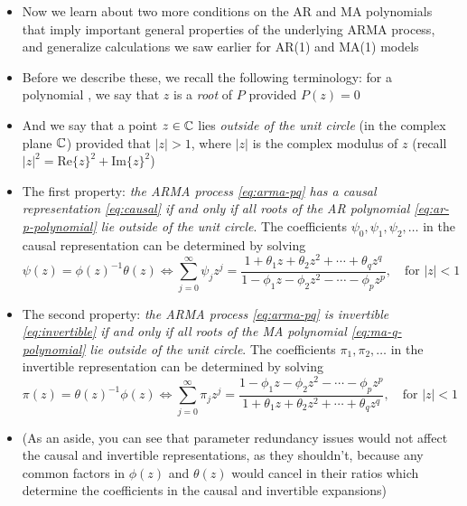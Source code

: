 \documentclass{article}
\begin{document}
\begin{itemize}
\item Now we learn about two more conditions on the AR and MA polynomials that
  imply important general properties of the underlying ARMA process, and
  generalize calculations we saw earlier for AR(1) and MA(1) models

\item Before we describe these, we recall the following terminology: for a
  polynomial , we say that $z$ is a
  \emph{root} of $P$ provided $P(z) = 0$

\item And we say that a point $z \in \mathbb{C}$ lies \emph{outside of the unit circle} 
  (in the complex plane $\mathbb{C}$) provided that $|z| > 1$, where $|z|$ is the
  complex modulus of $z$ (recall $|z|^2 = \mathrm{Re}\{z\}^2 +
  \mathrm{Im}\{z\}^2$)     

\item The first property: \emph{the ARMA process \eqref{eq:arma-pq} has a causal
    representation \eqref{eq:causal} if and only if all roots of the AR
    polynomial \eqref{eq:ar-p-polynomial} lie outside of the unit circle}. The
  coefficients $\psi_0,\psi_1,\psi_2,\dots$ in the causal representation can be
  determined by solving  
  \[
  \psi(z) = \phi(z)^{-1} \theta(z) \iff 
  \sum_{j=0}^\infty \psi_j z^j = \frac{1 + \theta_1 z + \theta_2 z^2 + \cdots +
    \theta_q z^q}{1 - \phi_1 z - \phi_2 z^2 - \cdots - \phi_p z^p}, \quad
  \text{for $|z| < 1$}
  \]

\item The second property: \emph{the ARMA process \eqref{eq:arma-pq} is
    invertible \eqref{eq:invertible} if and only if all roots of the MA
    polynomial \eqref{eq:ma-q-polynomial} lie outside of the unit circle}. The  
  coefficients $\pi_1,\pi_2,\dots$ in the invertible representation can be 
  determined by solving   
  \[
  \pi(z) = \theta(z)^{-1} \phi(z) \iff 
  \sum_{j=0}^\infty \pi_j z^j = \frac{1 - \phi_1 z - \phi_2 z^2 - \cdots -
    \phi_p z^p}{1 + \theta_1 z + \theta_2 z^2 + \cdots + \theta_q z^q}, \quad 
  \text{for $|z| < 1$}
  \]

\item (As an aside, you can see that parameter redundancy issues would not
  affect the causal and invertible representations, as they shouldn't, because
  any common factors in $\phi(z)$ and $\theta(z)$ would cancel in their ratios 
  which determine the coefficients in the causal and invertible expansions)  


\end{itemize}
\end{document}
